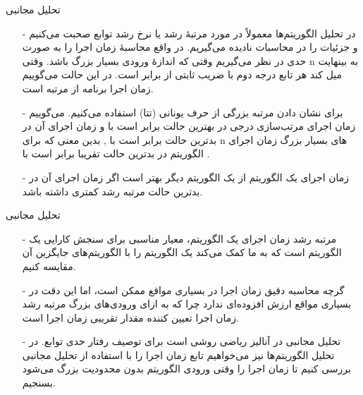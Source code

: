 \begin{frame}{‌تحلیل مجانبی}
\begin{itemize}\itemr
\item[-]
در تحلیل الگوریتم‌ها معمولاً در مورد مرتبهٔ رشد
یا نرخ رشد توابع
صحبت می‌کنیم و جزئیات را در محاسبات نادیده می‌گیریم. در واقع محاسبهٔ زمان اجرا را به صورت حدی در نظر می‌گیریم وقتی که اندازهٔ ورودی بسیار بزرگ باشد. وقتی n به بینهایت میل کند هر تابع درجه دوم با
ضریب ثابتی از
برابر است. در این حالت می‌گوییم زمان اجرا برنامه از مرتبه
است.
\item[-]
برای نشان دادن مرتبه بزرگی از حرف یونانی
\m{\Theta}
(تتا)
استفاده می‌کنیم. می‌گوییم زمان اجرای مرتب‌سازی درجی در بهترین حالت برابر است با
و زمان اجرای آن در بدترین حالت برابر است با
,
بدین معنی که برای n های بسیار بزرگ زمان اجرای الگوریتم در بدترین حالت تقریبا برابر است با
.
\item[-]
زمان اجرای یک الگوریتم از یک الگوریتم دیگر بهتر است اگر زمان اجرای آن در بدترین حالت مرتبه رشد کمتری
داشته باشد.
\end{itemize}
\end{frame}


\begin{frame}{‌تحلیل مجانبی}
\begin{itemize}\itemr
\item[-]
مرتبه رشد
زمان اجرای یک الگوریتم، معیار مناسبی برای سنجش کارایی
یک الگوریتم است که به ما کمک می‌کند یک الگوریتم را با الگوریتم‌های جایگزین آن مقایسه کنیم.
\item[-]
 گرچه محاسبه دقیق زمان اجرا در بسیاری مواقع ممکن است، اما این دقت در بسیاری مواقع ارزش افزوده‌ای ندارد چرا که به ازای ورودی‌های بزرگ مرتبه رشد زمان اجرا تعیین کننده مقدار تقریبی زمان اجرا است.
\item[-]
تحلیل مجانبی
در آنالیز ریاضی روشی است برای توصیف رفتار حدی توابع. در تحلیل الگوریتم‌ها نیز می‌خواهیم تابع زمان اجرا را با استفاده از تحلیل مجانبی بررسی کنیم تا زمان اجرا را وقتی ورودی الگوریتم بدون محدودیت بزرگ می‌شود بسنجیم.
\end{itemize}
\end{frame}


